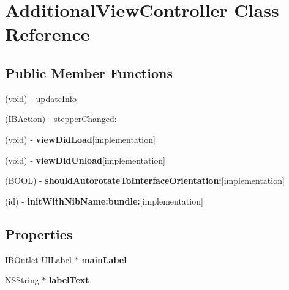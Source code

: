 \hypertarget{interface_additional_view_controller}{\section{Additional\-View\-Controller Class Reference}
\label{interface_additional_view_controller}
}
\subsection*{Public Member Functions}
\begin{DoxyCompactItemize}
\item 
(void) -\/ \hyperlink{interface_additional_view_controller_aa4f64e2b331433a8209d1a217f9a0e58}{update\-Info}
\item 
(I\-B\-Action) -\/ \hyperlink{interface_additional_view_controller_a5021b82168562390bb29ef85d7142d47}{stepper\-Changed\-:}
\item 
\hypertarget{interface_additional_view_controller_a4fb3e1a52a1d6f1df308f92bd60bcb34}{(void) -\/ {\bfseries view\-Did\-Load}{\ttfamily  \mbox{[}implementation\mbox{]}}}\label{interface_additional_view_controller_a4fb3e1a52a1d6f1df308f92bd60bcb34}

\item 
\hypertarget{interface_additional_view_controller_a12fd5bc53648175f0b70cdc79c346925}{(void) -\/ {\bfseries view\-Did\-Unload}{\ttfamily  \mbox{[}implementation\mbox{]}}}\label{interface_additional_view_controller_a12fd5bc53648175f0b70cdc79c346925}

\item 
\hypertarget{interface_additional_view_controller_ada47f6bbf95b9c080e80a826ca14fd2e}{(B\-O\-O\-L) -\/ {\bfseries should\-Autorotate\-To\-Interface\-Orientation\-:}{\ttfamily  \mbox{[}implementation\mbox{]}}}\label{interface_additional_view_controller_ada47f6bbf95b9c080e80a826ca14fd2e}

\item 
\hypertarget{interface_additional_view_controller_ab64fce750090b3a1b5b7b919a4300920}{(id) -\/ {\bfseries init\-With\-Nib\-Name\-:bundle\-:}{\ttfamily  \mbox{[}implementation\mbox{]}}}\label{interface_additional_view_controller_ab64fce750090b3a1b5b7b919a4300920}

\end{DoxyCompactItemize}
\subsection*{Properties}
\begin{DoxyCompactItemize}
\item 
\hypertarget{interface_additional_view_controller_a81e09d3c26c23c1d090c163946a5991d}{I\-B\-Outlet U\-I\-Label $\ast$ {\bfseries main\-Label}}\label{interface_additional_view_controller_a81e09d3c26c23c1d090c163946a5991d}

\item 
\hypertarget{interface_additional_view_controller_ab4d16d7e58fa3c47e2777cd1303d08e0}{N\-S\-String $\ast$ {\bfseries label\-Text}}\label{interface_additional_view_controller_ab4d16d7e58fa3c47e2777cd1303d08e0}

\end{DoxyCompactItemize}


